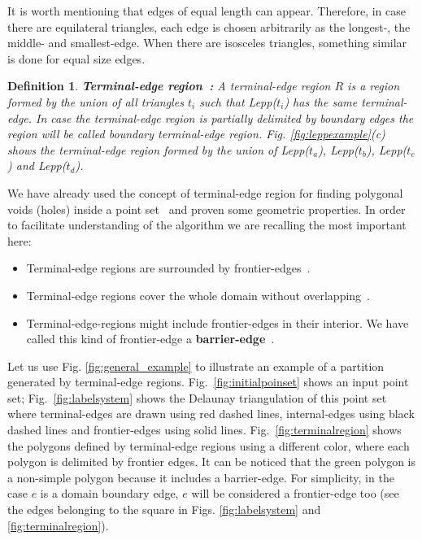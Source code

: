 \documentclass[lineno,pdflatex,sn-mathphys]{sn-jnl}%
\theoremstyle{thmstyleone}%
\theoremstyle{thmstyletwo}%
\theoremstyle{thmstylethree}%
\newtheorem{definition}{Definition}%
\begin{document}
\noindent
It is worth mentioning that edges of equal length can appear. Therefore, in case there are equilateral  triangles, each edge is chosen arbitrarily as the longest-, the middle- and smallest-edge. When there are isosceles triangles, something similar is done for equal size edges.


\begin{definition}{\textbf{Terminal-edge region~\cite{Ascom209}:}}
\label{d:terminaledgeregion}
A {\em terminal-edge region} $R$ is a region formed by the union of all triangles $t_i$ such that Lepp($t_i$) has the same terminal-edge.  In case the terminal-edge region  is partially delimited by boundary edges the region will be called {\em boundary terminal-edge region}. Fig. \ref{fig:leppexample}(c) shows the terminal-edge region formed by the union of  Lepp($t_a$), Lepp($t_b$), Lepp($t_c$) and Lepp($t_d$). 
\end{definition}


\noindent
We have already used  the concept of terminal-edge region for finding polygonal voids (holes) inside a point set~\cite{HerviasHCF13,Ascom209} and proven some geometric properties. In order to facilitate understanding of the algorithm we are recalling the most important here:

\begin{itemize}
    \item Terminal-edge regions are surrounded by frontier-edges~\cite{Ascom209}.
    \item Terminal-edge regions cover the whole domain without overlapping~\cite{Ascom209,Ojeda2018ANA}.
    \item Terminal-edge-regions might include frontier-edges in their interior. We have called this kind of frontier-edge a \textbf{barrier-edge}~\cite{Ascom209,Ojeda2018ANA}.
  
\end{itemize}
\noindent



\noindent
Let us use Fig. \ref{fig:general_example} to illustrate an example of a partition generated by terminal-edge regions. Fig.~\ref{fig:initialpoinset} shows an input point set; Fig.~\ref{fig:labelsystem} shows the Delaunay triangulation of this point set where terminal-edges are drawn using red dashed lines, internal-edges using black dashed lines and frontier-edges using  solid lines. Fig.~\ref{fig:terminalregion} shows the polygons defined by  terminal-edge regions using a different color, where each polygon is delimited by  frontier edges. It can be noticed that the green polygon is a non-simple polygon because it includes a barrier-edge. \noindent
For simplicity, in the case  $e$ is a domain boundary edge, $e$ will be considered a frontier-edge too (see the edges belonging to the square in Figs. \ref{fig:labelsystem} and \ref{fig:terminalregion}). 
\end{document}
